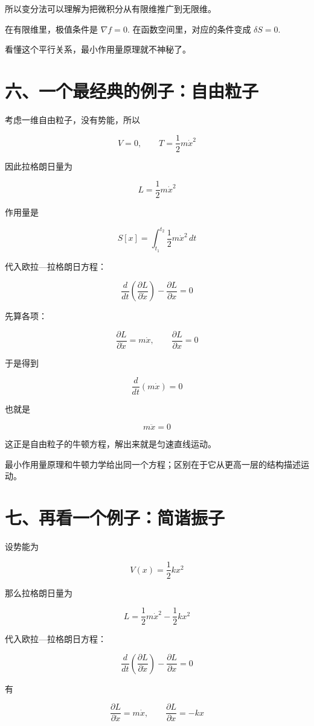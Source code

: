 所以变分法可以理解为把微积分从有限维推广到无限维。

在有限维里，极值条件是 \(\nabla f = 0\).
在函数空间里，对应的条件变成 \(\delta S = 0\).

看懂这个平行关系，最小作用量原理就不神秘了。

\section{六、一个最经典的例子：自由粒子}

考虑一维自由粒子，没有势能，所以

\[
V=0,\qquad T=\frac12 m\dot{x}^2
\]

因此拉格朗日量为

\[
L = \frac12 m\dot{x}^2
\]

作用量是

\[
S[x] = \int_{t_1}^{t_2}\frac12 m\dot{x}^2\,dt
\]

代入欧拉—拉格朗日方程：

\[
\frac{d}{dt}\left(\frac{\partial L}{\partial \dot{x}}\right)-\frac{\partial L}{\partial x}=0
\]

先算各项：

\[
\frac{\partial L}{\partial \dot{x}} = m\dot{x},\qquad \frac{\partial L}{\partial x}=0
\]

于是得到

\[
\frac{d}{dt}(m\dot{x})=0
\]

也就是

\[
m\ddot{x}=0
\]

这正是自由粒子的牛顿方程，解出来就是匀速直线运动。

最小作用量原理和牛顿力学给出同一个方程；区别在于它从更高一层的结构描述运动。

\section{七、再看一个例子：简谐振子}

设势能为

\[
V(x)=\frac12 kx^2
\]

那么拉格朗日量为

\[
L = \frac12 m\dot{x}^2 - \frac12 kx^2
\]

代入欧拉—拉格朗日方程：

\[
\frac{d}{dt}\left(\frac{\partial L}{\partial \dot{x}}\right)-\frac{\partial L}{\partial x}=0
\]

有

\[
\frac{\partial L}{\partial \dot{x}} = m\dot{x},\qquad
\frac{\partial L}{\partial x} = -kx
\]


